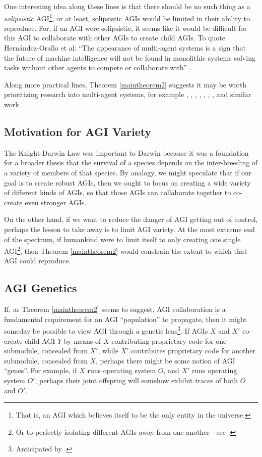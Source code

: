 \documentclass[runningheads]{llncs}
\begin{document}
One interesting idea along these lines is that there should be no
such thing as a \emph{solipsistic} AGI\footnote{That is, an AGI which believes itself
to be the only entity in the universe.}, or at least, solipsistic AGIs would be
limited in their ability to reproduce.
For, if an AGI were solipsistic, it
seems like it would be difficult for this AGI to collaborate with other AGIs
to create child AGIs.
To quote Hern{\'a}ndez-Orallo et al: ``The appearance of multi-agent systems is a sign that
the future of machine intelligence will not be found in monolithic systems
solving tasks without other agents to compete or collaborate with''
\cite{hernandez2011more}.

Along more practical lines, Theorem \ref{maintheorem2} suggests it may be worth
prioritizing research into multi-agent systems, for example
\cite{castelfranchi1998modelling}, \cite{hernandez2011more},
\cite{hibbard2011societies}, \cite{lazaridou2018emergence},
\cite{thorisson2004constructionist}, \cite{potyka2016group},
\cite{kolonin2018reputation},
and similar work.

\subsection{Motivation for AGI Variety}

The Knight-Darwin Law was important to
Darwin because it was a foundation for a broader thesis that the survival of a
species depends on the inter-breeding of a variety of members of that species.
By analogy, we might speculate that if our goal is to create robust AGIs, then
we ought to focus on creating a wide variety of different kinds of AGIs, so that
those AGIs can collaborate together to co-create even stronger AGIs.

On the other hand, if we want to reduce the danger of AGI getting out of control,
perhaps the lesson to take away is to limit AGI variety. At the most extreme end
of the spectrum, if humankind were to limit itself to only creating one single
AGI\footnote{Or to perfectly isolating
different AGIs away from
one another---see \cite{yampolskiy2012leakproofing}.}, then
Theorem \ref{maintheorem2} would constrain the extent to which
that AGI could reproduce.


\subsection{AGI Genetics}

If, as Theorem \ref{maintheorem2} seems to suggest, AGI collaboration
is a fundamental requirement for an AGI ``population'' to propagate, then it might
someday be possible to view AGI through a genetic lens\footnote{Anticipated
by \cite{buchanan1988artificial}.}. If AGIs $X$ and $X'$ co-create child AGI $Y$ by
means of $X$ contributing proprietary code for one submodule, concealed from $X'$,
while $X'$ contributes proprietary code for another submodule, concealed from $X$,
perhaps there might be some notion of AGI ``genes''. For example, if $X$ runs operating
system $O$, and $X'$ runs operating system $O'$, perhaps their joint offspring
will somehow exhibit traces of both $O$ and $O'$.
\end{document}
